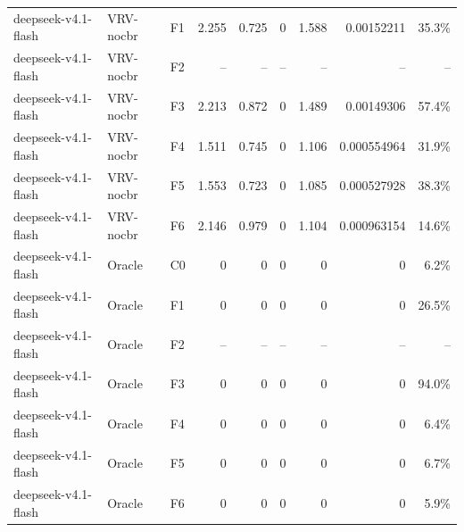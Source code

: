 \begin{tabular}{lllrrrrrr}
deepseek-v4.1-flash & VRV-nocbr & F1 & 2.255 & 0.725 & 0 & 1.588 & 0.00152211 & 35.3\% \\
deepseek-v4.1-flash & VRV-nocbr & F2 & -- & -- & -- & -- & -- & -- \\
deepseek-v4.1-flash & VRV-nocbr & F3 & 2.213 & 0.872 & 0 & 1.489 & 0.00149306 & 57.4\% \\
deepseek-v4.1-flash & VRV-nocbr & F4 & 1.511 & 0.745 & 0 & 1.106 & 0.000554964 & 31.9\% \\
deepseek-v4.1-flash & VRV-nocbr & F5 & 1.553 & 0.723 & 0 & 1.085 & 0.000527928 & 38.3\% \\
deepseek-v4.1-flash & VRV-nocbr & F6 & 2.146 & 0.979 & 0 & 1.104 & 0.000963154 & 14.6\% \\
deepseek-v4.1-flash & Oracle & C0 & 0 & 0 & 0 & 0 & 0 & 6.2\% \\
deepseek-v4.1-flash & Oracle & F1 & 0 & 0 & 0 & 0 & 0 & 26.5\% \\
deepseek-v4.1-flash & Oracle & F2 & -- & -- & -- & -- & -- & -- \\
deepseek-v4.1-flash & Oracle & F3 & 0 & 0 & 0 & 0 & 0 & 94.0\% \\
deepseek-v4.1-flash & Oracle & F4 & 0 & 0 & 0 & 0 & 0 & 6.4\% \\
deepseek-v4.1-flash & Oracle & F5 & 0 & 0 & 0 & 0 & 0 & 6.7\% \\
deepseek-v4.1-flash & Oracle & F6 & 0 & 0 & 0 & 0 & 0 & 5.9\% \\
\bottomrule
\end{tabular}

